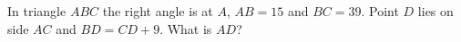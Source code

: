 In triangle $ABC$ the right angle is at $A$, $AB=15$ and $BC=39$. Point $D$ lies on side $AC$ and $BD=CD+9$. What is $AD$?

